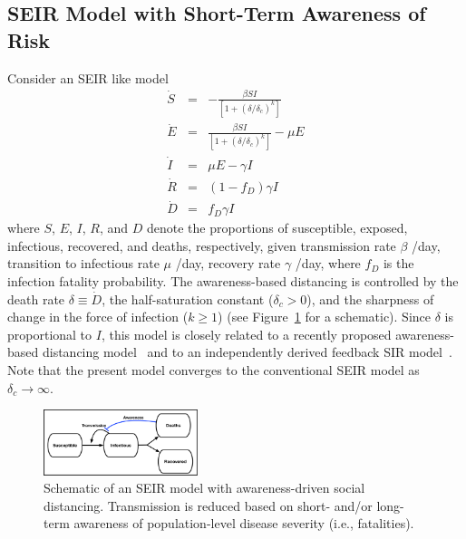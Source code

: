\subsection{SEIR Model with Short-Term Awareness of Risk}
Consider an SEIR like model
\begin{eqnarray}
\dot{S} &=& -\frac{\beta SI}{\left[1+\left(\delta/\delta_c\right)^{k}\right]}\\
\dot{E} &=& \frac{\beta SI}{\left[1+\left(\delta/\delta_c\right)^{k}\right]}-\mu E\\
\dot{I} &=& \mu E-\gamma I \\
\dot{R} &=& (1-f_D)\gamma I\\
\dot{D} &=& f_D\gamma I
\end{eqnarray}
where $S$, $E$, $I$, $R$, and $D$ denote the proportions of
susceptible, exposed, infectious, recovered, and deaths, respectively,
given transmission rate $\beta$ /day, transition
to infectious rate $\mu$ /day, recovery rate $\gamma$ /day,
where $f_D$ is the infection fatality probability.
The awareness-based distancing is controlled by 
the death rate $\delta\equiv \dot{D}$,
the half-saturation constant ($\delta_c>0$), and
the sharpness of change in the force of infection ($k\geq 1$)
(see Figure~\ref{fig.schematic} for a schematic).
Since $\delta$ is proportional to $I$, this model is closely related to a recently proposed awareness-based distancing model~\citep{eksin2019systematic}
and to an independently derived feedback SIR model~\citep{franco2020feedback}.
Note that the present
model converges to the conventional SEIR model as $\delta_c\rightarrow \infty$.
\begin{figure}[t!]
\begin{center}
\includegraphics[width=0.4\textwidth]{schematics/plateau_schematic.pdf}
\caption{Schematic of an SEIR model with awareness-driven social distancing.
Transmission is reduced based on short- and/or long-term awareness
of population-level disease severity (i.e., fatalities).
\label{fig.schematic}}
\end{center}

\end{figure}
